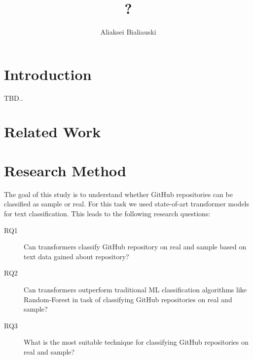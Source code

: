 \documentclass[sigplan,nonacm,review]{acmart}
\title{?}
\author{Aliaksei Bialiauski}
\affiliation{
    \institution{?}
    \city{Minsk}
    \country{Belarus}
}
\begin{document}
\maketitle


\section{Introduction}\label{sec:introduction}
TBD.. \citet{testCitation}


\section{Related Work}\label{sec:related}


\section{Research Method}\label{sec:method}
The goal of this study is to understand whether GitHub repositories can be
classified as sample or real. For this task we used state-of-art transformer
models for text classification. This leads to the following research questions:
\begin{description}
    \item[RQ1] Can transformers classify GitHub repository on real and
    sample based on text data gained about repository?
    \item[RQ2] Can transformers outperform traditional ML classification
    algorithms like Random-Forest in task of classifying GitHub repositories on
    real and sample?
    \item[RQ3] What is the most suitable technique for classifying GitHub
    repositories on real and sample?
\end{description}
\end{document}
